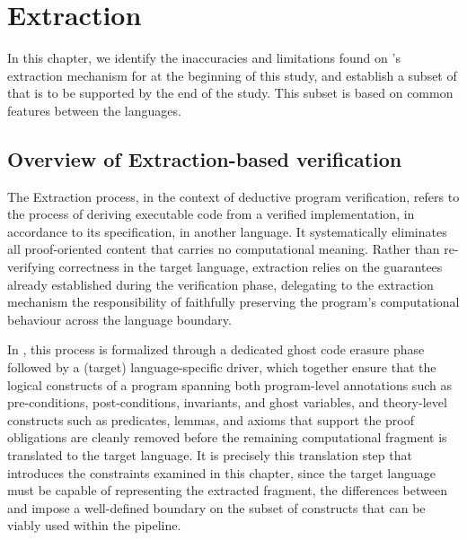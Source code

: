 
%

\chapter{Extraction}
\label{cha:Extraction}

In this chapter, we identify the inaccuracies and limitations found on \whythree's extraction mechanism for \cml at the beginning of
this study, and establish a subset of \whyml that is to be supported by the end of the study. This subset is based on common features
between the languages.

\section{Overview of Extraction-based verification}

The Extraction process, in the context of deductive program verification, refers to the process of deriving executable code from a verified implementation, in accordance
to its specification, in another language. It systematically eliminates all proof-oriented content that carries no computational meaning. Rather than re-verifying
correctness in the target language, extraction relies on the guarantees already established during the verification phase, delegating to the extraction mechanism the
responsibility of faithfully preserving the program's computational behaviour across the language boundary. 

In \whythree, this process is formalized through a dedicated ghost code erasure phase followed by a (target) language-specific driver, which together ensure that the
logical constructs of a \whyml program spanning both program-level annotations such as pre-conditions, post-conditions, invariants, and ghost variables, and theory-level
constructs such as predicates, lemmas, and axioms that support the proof obligations are cleanly removed before the remaining computational fragment is translated to the
target language. It is precisely this translation step that introduces the constraints examined in this chapter, since the target language must be capable of representing
the extracted fragment, the differences between \whyml and \cml impose a well-defined boundary on the subset of \whyml constructs that can be viably used within the pipeline.

